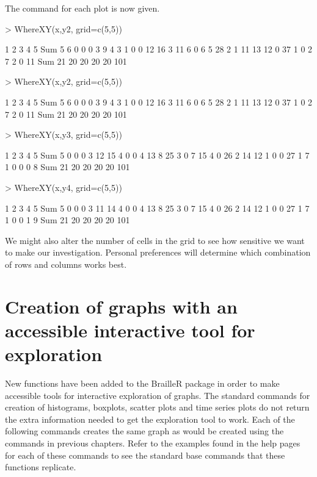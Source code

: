 The  command for each plot is now given. 

\begin{Schunk}
\begin{Sinput}
> WhereXY(x,y2, grid=c(5,5)) 
\end{Sinput}
\begin{Soutput}
     1  2  3  4  5 Sum
5    6  0  0  0  3   9
4    3  1  0  0 12  16
3   11  6  0  6  5  28
2    1 11 13 12  0  37
1    0  2  7  2  0  11
Sum 21 20 20 20 20 101
\end{Soutput}
\begin{Sinput}
> WhereXY(x,y2, grid=c(5,5)) 
\end{Sinput}
\begin{Soutput}
     1  2  3  4  5 Sum
5    6  0  0  0  3   9
4    3  1  0  0 12  16
3   11  6  0  6  5  28
2    1 11 13 12  0  37
1    0  2  7  2  0  11
Sum 21 20 20 20 20 101
\end{Soutput}
\begin{Sinput}
> WhereXY(x,y3, grid=c(5,5)) 
\end{Sinput}
\begin{Soutput}
     1  2  3  4  5 Sum
5    0  0  0  3 12  15
4    0  0  4 13  8  25
3    0  7 15  4  0  26
2   14 12  1  0  0  27
1    7  1  0  0  0   8
Sum 21 20 20 20 20 101
\end{Soutput}
\begin{Sinput}
> WhereXY(x,y4, grid=c(5,5)) 
\end{Sinput}
\begin{Soutput}
     1  2  3  4  5 Sum
5    0  0  0  3 11  14
4    0  0  4 13  8  25
3    0  7 15  4  0  26
2   14 12  1  0  0  27
1    7  1  0  0  1   9
Sum 21 20 20 20 20 101
\end{Soutput}
\end{Schunk}

 
We might also alter the number of cells in the grid to see how sensitive we want to make our investigation. Personal preferences will determine which combination of rows and columns works best. 

\section{Creation of graphs with an accessible interactive tool for exploration}

New functions have been added to the BrailleR package in order to make accessible tools for interactive exploration of graphs. The standard commands for creation of histograms, boxplots, scatter plots and time series plots do not return the extra information needed to get the exploration tool to work. Each of the following commands creates the same graph as would be created using the commands in previous chapters. Refer to the examples found in the help pages for each of these commands to see the standard base \R{}  commands that these 
 functions replicate.

